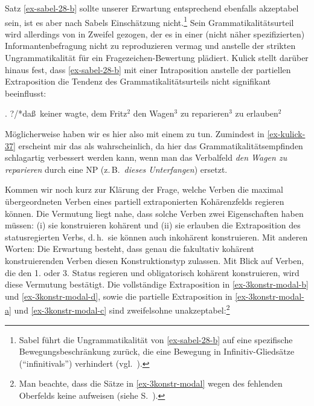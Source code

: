Satz \ref{ex-sabel-28-b} sollte unserer Erwartung entsprechend ebenfalls akzeptabel sein, ist es aber nach Sabels Einschätzung nicht.\footnote{Sabel führt die Ungrammatikalität von \ref{ex-sabel-28-b} auf eine spezifische Bewegungsbeschränkung zurück, die eine Bewegung in Infinitiv-Gliedsätze ("`infinitivals"') verhindert (vgl.\ \citealt[418]{Sabel:95}). } Sein Grammatikalitätsurteil wird allerdings von \cite{Kulick:00} in Zweifel gezogen, der es in einer (nicht näher spezifizierten) Informantenbefragung nicht zu reproduzieren vermag und anstelle der strikten Ungrammatikalität für ein Fragezeichen-Bewertung plädiert. Kulick stellt darüber hinaus fest, dass \ref{ex-sabel-28-b} mit einer Intraposition anstelle der partiellen Extraposition die Tendenz des Grammatikalitätsurteils nicht signifikant beeinflusst:

\ex. ?/*\label{ex-kulick-37}da\ss\ keiner wagte, dem Fritz$^2$ den Wagen$^3$ zu reparieren$^3$ zu erlauben$^2$ \\ \citep[(37)]{Kulick:00} 

Möglicherweise haben wir es hier also mit einem  zu tun. Zumindest in \ref{ex-kulick-37} erscheint mir das als wahrscheinlich, da hier das Grammatikalitätsempfinden schlagartig verbessert werden kann, wenn man das Verbalfeld {\it den Wagen zu reparieren} durch  eine NP (z.\,B.\ {\it dieses Unterfangen}) ersetzt. 


Kommen wir noch kurz zur Klärung der Frage, welche Verben die maximal übergeordneten Verben eines partiell extraponierten Kohärenzfelds regieren können. Die Vermutung liegt nahe, dass solche Verben zwei Eigenschaften haben müssen: (i) sie konstruieren kohärent und (ii) sie erlauben die Extraposition des statusregierten Verbs, d.\,h.\ sie können auch inkohärent konstruieren. Mit anderen Worten: Die Erwartung besteht, dass genau die fakultativ kohärent konstruierenden Verben diesen Konstruktionstyp zulassen. Mit Blick auf Verben, die den 1. oder 3. Status regieren und obligatorisch kohärent konstruieren, wird diese Vermutung bestätigt. Die vollständige Extraposition in \ref{ex-3konstr-modal-b} und \ref{ex-3konstr-modal-d}, sowie die partielle Extraposition in \ref{ex-3konstr-modal-a} und \ref{ex-3konstr-modal-c} sind zweifelsohne unakzeptabel:\footnote{Man beachte, dass die Sätze in \ref{ex-3konstr-modal} wegen des fehlenden Oberfelds keine  aufweisen (siehe S.~\pageref{sec-linksstellung}). } 

